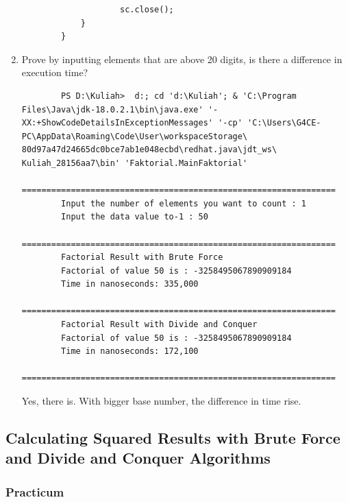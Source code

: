 \documentclass[12pt,titlepage]{article}
\begin{document}
\begin{enumerate}
\begin{verbatim}
                    sc.close();
            }
        }
    \end{verbatim}
    \item Prove by inputting elements that are above 20 digits, is there a difference in execution time?
    \begin{verbatim}
        PS D:\Kuliah>  d:; cd 'd:\Kuliah'; & 'C:\Program Files\Java\jdk-18.0.2.1\bin\java.exe' '-XX:+ShowCodeDetailsInExceptionMessages' '-cp' 'C:\Users\G4CE-PC\AppData\Roaming\Code\User\workspaceStorage\ 80d97a47d24665dc0bce7ab1e048ecbd\redhat.java\jdt_ws\ Kuliah_28156aa7\bin' 'Faktorial.MainFaktorial' 
        ================================================================
        Input the number of elements you want to count : 1
        Input the data value to-1 : 50
        ================================================================
        Factorial Result with Brute Force
        Factorial of value 50 is : -3258495067890909184
        Time in nanoseconds: 335,000
        ================================================================
        Factorial Result with Divide and Conquer
        Factorial of value 50 is : -3258495067890909184
        Time in nanoseconds: 172,100
        ================================================================ 
    \end{verbatim}
    Yes, there is. With bigger base number, the difference in time rise.
\end{enumerate}

\subsection{Calculating Squared Results with Brute Force and Divide and Conquer Algorithms}

\subsubsection{Practicum}
\end{document}
